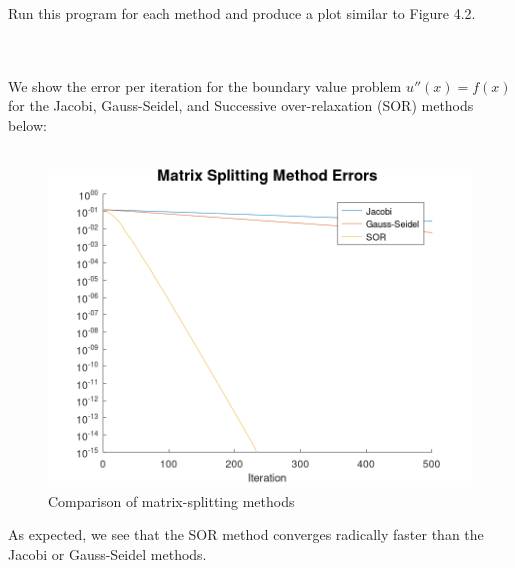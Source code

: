 Run this program for each method and produce a plot similar to Figure 4.2.

\begin{solution}\ \\\\
    We show the error per iteration for the boundary value problem $u''(x) = f(x)$ for the Jacobi, Gauss-Seidel, and
    Successive over-relaxation (SOR) methods below: \\\\

    \begin{figure}[h]
        \centering
        \includegraphics[width=.7\textwidth]{problem_1a_matrix_splitting_error_500_iterations.png}
        \caption[]{Comparison of matrix-splitting methods}
    \end{figure}

    As expected, we see that the SOR method converges radically faster than the Jacobi or Gauss-Seidel methods.
    \ \\\\
\end{solution}